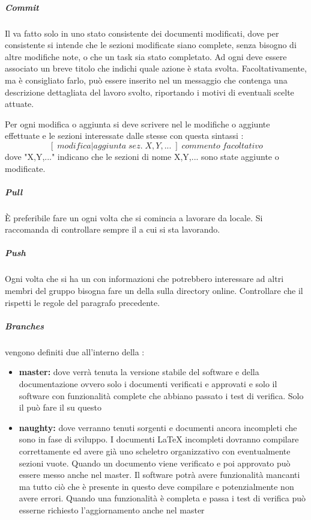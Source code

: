 \documentclass[12pt,a4paper]{article}
\begin{document}
\subparagraph{Commit}\label{Commit}
Il  va fatto solo in uno stato consistente dei documenti modificati, dove per consistente si intende che le sezioni modificate siano complete, senza bisogno di altre modifiche note, o che un task sia stato completato. Ad ogni  deve essere associato un breve titolo che indichi quale azione è stata svolta. Facoltativamente, ma è consigliato farlo, può essere inserito nel  un messaggio che contenga una descrizione dettagliata del lavoro svolto, riportando i motivi di eventuali scelte attuate.

Per ogni modifica o aggiunta si deve scrivere nel  le modifiche o aggiunte effettuate e le sezioni interessate dalle stesse con questa sintassi : $$[\;modifica|aggiunta\; sez.\; X,Y,...\;]\; commento\; facoltativo$$ dove "X,Y,..." indicano che le sezioni di nome X,Y,... sono state aggiunte o modificate.

\subparagraph{Pull}
È preferibile fare un  ogni volta che si comincia a lavorare da locale. Si raccomanda di controllare sempre il  a cui si sta lavorando.

\subparagraph{Push}
Ogni volta che si ha un  con informazioni che potrebbero interessare ad altri membri del gruppo bisogna fare un  della  sulla directory online. Controllare che il  rispetti le regole del paragrafo precedente.

\subparagraph{Branches} vengono definiti due  all'interno della :
\begin{itemize}
	\item \textbf{master:} dove verrà tenuta la versione stabile del software e della documentazione ovvero solo i documenti verificati e  approvati e solo il software con funzionalità complete che abbiano passato i test di verifica. Solo il \RE{} può fare il  su questo 
	\item \textbf{naughty:} dove verranno tenuti sorgenti e documenti ancora incompleti che sono in fase di sviluppo. I documenti \LaTeX{} incompleti dovranno compilare correttamente ed avere già uno scheletro organizzativo con eventualmente sezioni vuote. Quando un documento viene verificato e poi approvato può essere messo anche nel  master. Il software potrà avere funzionalità mancanti ma tutto ciò che è presente in questo  deve compilare e potenzialmente non avere errori. Quando una funzionalità è completa e passa i test di verifica può esserne richiesto l'aggiornamento anche nel  master
\end{itemize}
\end{document}
